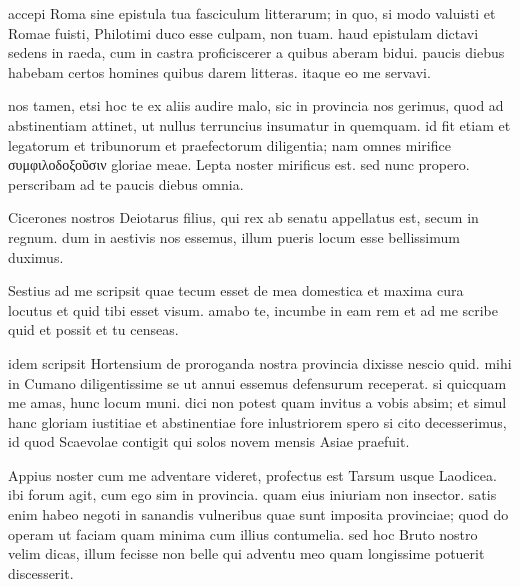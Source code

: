 


 accepi Roma sine epistula tua fasciculum litterarum; in quo, si modo valuisti et Romae fuisti, Philotimi duco esse culpam, non tuam. haud epistulam dictavi sedens in raeda, cum in castra proficiscerer a quibus aberam bidui. paucis diebus habebam certos homines quibus darem litteras. itaque eo me servavi.

 nos tamen, etsi hoc te ex aliis audire malo, sic in provincia nos gerimus, quod ad abstinentiam attinet, ut nullus terruncius insumatur in quemquam. id fit etiam et legatorum et tribunorum et praefectorum diligentia; nam omnes mirifice συμφιλοδοξοῦσιν gloriae meae. Lepta noster mirificus est. sed nunc propero. perscribam ad te paucis diebus omnia.

 Cicerones nostros Deiotarus filius, qui rex ab senatu appellatus est, secum in regnum. dum in aestivis nos essemus, illum pueris locum esse bellissimum duximus.

 Sestius ad me scripsit quae tecum esset de mea domestica et maxima cura locutus et quid tibi esset visum. amabo te, incumbe in eam rem et ad me scribe quid et possit et tu censeas.

 idem scripsit Hortensium de proroganda nostra provincia dixisse nescio quid. mihi in Cumano diligentissime se ut annui essemus defensurum receperat. si quicquam me amas, hunc locum muni. dici non potest quam invitus a vobis absim; et simul hanc gloriam iustitiae et abstinentiae fore inlustriorem spero si cito decesserimus, id quod Scaevolae contigit qui solos novem mensis Asiae praefuit.

 Appius noster cum me adventare videret, profectus est Tarsum usque Laodicea. ibi forum agit, cum ego sim in provincia. quam eius iniuriam non insector. satis enim habeo negoti in sanandis vulneribus quae sunt imposita provinciae; quod do operam ut faciam quam minima cum illius contumelia. sed hoc Bruto nostro velim dicas, illum fecisse non belle qui adventu meo quam longissime potuerit discesserit.

